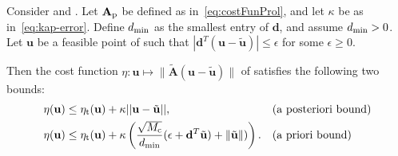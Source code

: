 \documentclass[onefignum,onetabnum]{siamart251104}
\newcommand{\bv}[1]{{\mathbf #1}}
\newcommand{\bt}[1]{{\mathbf{#1}}}
\newcommand{\com}[1]{{{#1}_{\rm{c}}}} %
\newcommand{\prol}[1]{{{#1}_{\rm{p}}}} %
\newcommand{\thi}[1]{{{#1}_{\rm{t}}}}	%
\newcommand{\vwei}{\bv{u}} %
\newcommand{\Ap}{{\bt{A}}}
\newcommand{\fopt}{{\eta}}
\newcommand{\dreg}{{{\bv{d}}}}
\begin{document}
\begin{theorem}\label{the:CompressedOptFun}
Consider  and . Let $\prol{\Ap}$ be defined as in~\eqref{eq:costFunProl}, and let $\kappa$ be as in~\eqref{eq:kap-error}. Define $d_{\rm min}$ as the smallest entry of $\dreg$, and assume $d_{\rm min} > 0$. Let $\vwei$ be a feasible point of  such that $|\dreg^T(\vwei - \tilde{\vwei})| \leq \epsilon$ for some $\epsilon \geq 0$.

Then the cost function $\fopt : \vwei \mapsto \|\tilde{\Ap}(\vwei - \tilde{\vwei})\|$ of  satisfies the following two bounds:
\begin{align*}
\fopt(\vwei)   &\leq  \thi{\fopt}(\vwei) + \kappa  ||\vwei - \tilde{\vwei}||,  &&  \text{(a posteriori bound)} \\
\fopt(\vwei)  &\leq \thi{\fopt}(\vwei) + \kappa  \left( \frac{\sqrt{\com{M}}}{d_{\rm{min}}} ( \epsilon+ \dreg^T \tilde{\vwei})  + \|\tilde{\vwei}\| ) \right).
&& \text{(a priori bound)}
\end{align*}
\end{theorem}
\end{document}
